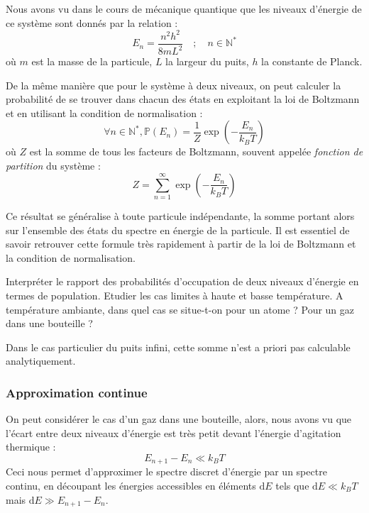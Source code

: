 \documentclass[11pt,fleqn]{book} %
\newcommand{\dd}{\mathrm{d}}
\begin{document}
Nous avons vu dans le cours de mécanique quantique que les niveaux d'énergie de ce système sont donnés par la relation :
\begin{equation}
	E_n = \frac{n^2 h^2}{8 m L^2} \quad ; \quad n \in \mathbb{N}^\ast
\end{equation}
où $m$ est la masse de la particule, $L$ la largeur du puits, $h$ la constante de Planck. 

De la même manière que pour le système à deux niveaux, on peut calculer la probabilité de se trouver dans chacun des états en exploitant la loi de Boltzmann et en utilisant la condition de normalisation :
\begin{equation}
	\forall n \in \mathbb{N}^\ast, \mathbb{P}(E_n) = \frac{1}{Z} \exp\left(-\frac{E_n}{k_B T}\right)
\end{equation}
où $Z$ est la somme de tous les facteurs de Boltzmann, souvent appelée \textit{fonction de partition} du système :
\begin{equation}
	Z = \sum_{n=1}^\infty \exp\left(-\frac{E_n}{k_B T}\right)
\end{equation}
\begin{remark}
	Ce résultat se généralise à toute particule indépendante, la somme portant alors sur l'ensemble des états du spectre en énergie de la particule. Il est essentiel de savoir retrouver cette formule très rapidement à partir de la loi de Boltzmann et la condition de normalisation.
\end{remark}



\begin{capex}
	Interpréter le rapport des probabilités d'occupation de deux niveaux d'énergie en termes de population. Etudier les cas limites à haute et basse température. A température ambiante, dans quel cas se situe-t-on pour un atome ? Pour un gaz dans une bouteille ?
\end{capex}

Dans le cas particulier du puits infini, cette somme n'est a priori pas calculable analytiquement. 

\subsubsection{Approximation continue}

On peut considérer le cas d'un gaz dans une bouteille, alors, nous avons vu que l'écart entre deux niveaux d'énergie est très petit devant l'énergie d'agitation thermique :
\begin{equation}
	E_{n+1} - E_n \ll k_B T
\end{equation}
Ceci nous permet d'approximer le spectre discret d'énergie par un spectre continu, en découpant les énergies accessibles en éléments $\dd E$ tels que $\dd E \ll k_B T$ mais $\dd E \gg E_{n+1} - E_n$.
\end{document}
